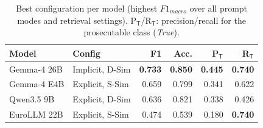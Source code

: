 \begin{table}[t]
\centering
\caption{Best configuration per model (highest $F1_{macro}$ over all prompt modes and retrieval settings). P$_\mathsf{T}$/R$_\mathsf{T}$: precision/recall for the prosecutable class (\emph{True}).}
\label{tab:e-best-per-model}
\small
\setlength{\tabcolsep}{4pt}
\begin{tabular}{llrrrr}
\toprule
Model & Config & F1 & Acc. & P$_\mathsf{T}$ & R$_\mathsf{T}$ \\
\midrule
Gemma-4 26B & Implicit, D-Sim & \textbf{0.733} & \textbf{0.850} & \textbf{0.445} & \textbf{0.740} \\
Gemma-4 E4B & Explicit, S-Sim & 0.659 & 0.799 & 0.341 & 0.622 \\
Qwen3.5 9B & Explicit, D-Sim & 0.636 & 0.821 & 0.338 & 0.426 \\
EuroLLM 22B & Explicit, S-Sim & 0.474 & 0.539 & 0.180 & \textbf{0.740} \\
\bottomrule
\end{tabular}
\end{table}